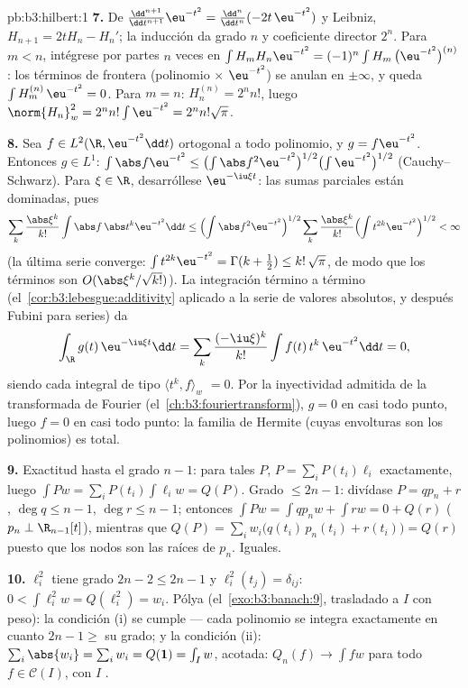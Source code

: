 \begin{solution}{pb:b3:hilbert:1}
\textbf{7.} De $\frac{\dd^{n+1}}{\dd t^{n+1}}\eu^{-t^2} =
\frac{\dd^n}{\dd t^n}(-2t\,\eu^{-t^2})$ y Leibniz, $H_{n+1}
= 2tH_n - H_n'$; la inducción da grado $n$ y coeficiente director $2^n$.
Para $m < n$, intégrese por partes $n$ veces en
$\int H_m H_n\eu^{-t^2} = (-1)^n\int H_m\,\bigl(\eu^{-t^2}
\bigr)^{(n)}$: los términos de frontera (polinomio $\times$
$\eu^{-t^2}$) se anulan en $\pm\infty$, y queda $\int
H_m^{(n)}\,\eu^{-t^2} = 0$. Para $m = n$: $H_n^{(n)} = 2^nn!$, luego
$\norm{H_n}_w^2 = 2^nn!\int\eu^{-t^2} = 2^nn!\sqrt\pi$.

\textbf{8.} Sea $f \in L^2(\R, \eu^{-t^2}\dd t)$ ortogonal a todo
polinomio, y $g = f\eu^{-t^2}$. Entonces $g \in
L^1$: $\int\abs f\eu^{-t^2} \leq \bigl(\int\abs
f^2\eu^{-t^2}\bigr)^{1/2}\bigl(\int\eu^{-t^2}\bigr)^{1/2}$
(Cauchy--Schwarz). Para $\xi \in \R$, desarróllese $\eu^{-\iu\xi t}$:
las sumas parciales están dominadas, pues
\[
\sum_k\frac{\abs\xi^k}{k!}\int\abs f\,\abs t^k\eu^{-t^2}\dd t
\leq \Bigl(\int \abs f^2\eu^{-t^2}\Bigr)^{1/2}
\sum_k\frac{\abs\xi^k}{k!}\Bigl(\int
t^{2k}\eu^{-t^2}\Bigr)^{1/2} < \infty
\]
(la última serie converge: $\int t^{2k}\eu^{-t^2} =
\Gamma(k+\frac12) \leq k!\,\sqrt\pi$, de modo que los términos son
$O(\abs\xi^k/\sqrt{k!})$). La integración término a término
(el~\cref{cor:b3:lebesgue:additivity} aplicado a la serie de valores
absolutos, y después Fubini para series) da
\[
\int_\R g(t)\,\eu^{-\iu\xi t}\dd t
= \sum_k\frac{(-\iu\xi)^k}{k!}\int f(t)\,t^k\,\eu^{-t^2}\dd t
= 0 ,
\]
siendo cada integral de tipo $\langle t^k, f\rangle_w$ $= 0$. Por la
inyectividad admitida de la transformada de Fourier
(el~\cref{ch:b3:fouriertransform}), $g = 0$ en casi todo punto, luego
$f = 0$ en casi todo punto: la familia de Hermite (cuyas envolturas son
los polinomios) es total.

\textbf{9.} Exactitud hasta el grado $n - 1$: para tales $P$, $P =
\sum_iP(t_i)\ell_i$ exactamente, luego $\int Pw = \sum_iP(t_i)\int
\ell_iw = Q(P)$. Grado $\leq 2n - 1$: divídase $P = qp_n + r$,
$\deg q \leq n - 1$, $\deg r \leq n-1$; entonces $\int Pw = \int
qp_nw + \int rw = 0 + Q(r)$ ($p_n \perp \R_{n-1}[t]$), mientras que
$Q(P) = \sum_iw_i\bigl(q(t_i)\,p_n(t_i) + r(t_i)\bigr) = Q(r)$
puesto que los nodos son las raíces de $p_n$. Iguales.

\textbf{10.} $\ell_i^2$ tiene grado $2n - 2 \leq 2n - 1$ y
$\ell_i^2(t_j) = \delta_{ij}$: $0 < \int\ell_i^2w = Q(\ell_i^2)
= w_i$. Pólya (el~\cref{exo:b3:banach:9}, trasladado a $I$ con peso): la
condición (i) se cumple --- cada polinomio se integra exactamente en
cuanto $2n - 1 \geq$ su grado; y la condición (ii):
$\sum_i\abs{w_{i}} = \sum_iw_i = Q(\mathbf 1) = \int_Iw$,
acotada: $Q_n(f) \to \int fw$ para todo $f \in \mathcal C(I)$, con $I$
.


\end{solution}
